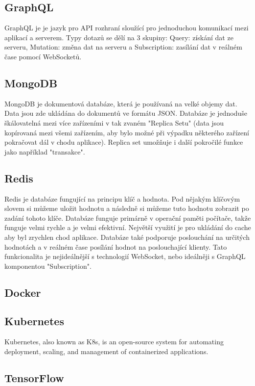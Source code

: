 \subsection{GraphQL}
GraphQL je je jazyk pro API rozhraní sloužící pro jednoduchou komunikací mezi aplikací a serverem. Typy dotazů se dělí na 3 skupiny: Query: získání dat ze serveru, Mutation: změna dat na serveru a Subscription: zasílání dat v reálném čase pomocí WebSocketů.

\subsection{MongoDB}
MongoDB je dokumentová databáze, která je používaná na velké objemy dat. Data jsou zde ukládána do dokumentů ve formátu JSON. Databáze je jednoduše škálovatelná mezi více zařízeními v tak zvaném "Replica Setu" (data jsou kopírovaná mezi všemi zařízením, aby bylo možné při výpadku některého zařízení pokračovat dál v chodu aplikace). Replica set umožňuje i další pokročilé funkce jako například "transakce".

\subsection{Redis}
Redis je databáze fungující na principu klíč a hodnota. Pod nějakým klíčovým slovem si můžeme uložit hodnotu a následně si můžeme tuto hodnotu zobrazit po zadání tohoto klíče. Databáze funguje primárně v operační paměti počítače, takže funguje velmi rychle a je velmi efektivní. Největší využití je pro ukládání do cache aby byl zrychlen chod aplikace. Databáze také podporuje poslouchání na určitých hodnotách a v reálném čase posílání hodnot na poslouchající klienty. Tato funkcionalita je nejideálnější s technologií WebSocket, nebo ideálněji s GraphQL komponentou "Subscription". 

\subsection{Docker}

\subsection{Kubernetes}
Kubernetes, also known as K8s, is an open-source system for automating deployment, scaling, and management of containerized applications. \cite{Kubernetes}

\subsection{TensorFlow}